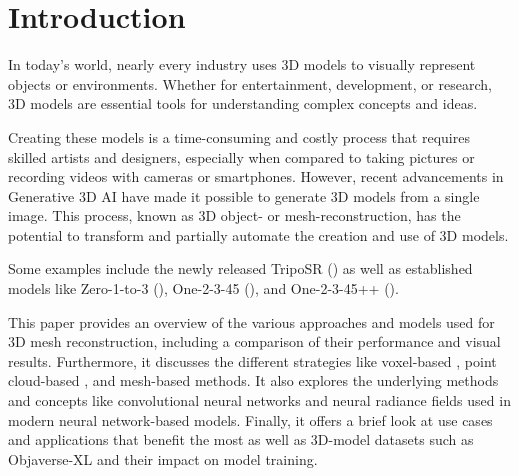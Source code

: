 

\section{Introduction}
\label{section:Introduction}
In today's world, nearly every industry uses 3D models to visually represent objects or environments. Whether for entertainment, development, or research, 3D models are essential tools for understanding complex concepts and ideas.

Creating these models is a time-consuming and costly process that requires skilled artists and designers, especially when compared to taking pictures or recording videos with cameras or smartphones. However, recent advancements in Generative 3D AI have made it possible to generate 3D models from a single image. This process, known as 3D object- or mesh-reconstruction, has the potential to transform and partially automate the creation and use of 3D models.

Some examples include the newly released TripoSR (\textcite{tochilkin_triposr_2024}) as well as established models like Zero-1-to-3 (\textcite{liu_zero-1--3_2023}), One-2-3-45 (\textcite{liu_one-2-3-45_2023}), and One-2-3-45++ (\textcite{liu_one-2-3-45_2023-1}).

This paper provides an overview of the various approaches and models used for 3D mesh reconstruction, including a comparison of their performance and visual results.
Furthermore, it discusses the different strategies like voxel-based \autocite{zhirong_wu_3d_2015}, point cloud-based \autocite{charles_pointnet_2017}, and mesh-based \autocite{wang_pixel2mesh_2018} methods.
It also explores the underlying methods and concepts like convolutional neural networks and neural radiance fields \autocite{mildenhall_nerf_2021} used in modern neural network-based models.
Finally, it offers a brief look at use cases and applications that benefit the most as well as 3D-model datasets such as Objaverse-XL \autocite{deitke_objaverse-xl_2023} and their impact on model training.


